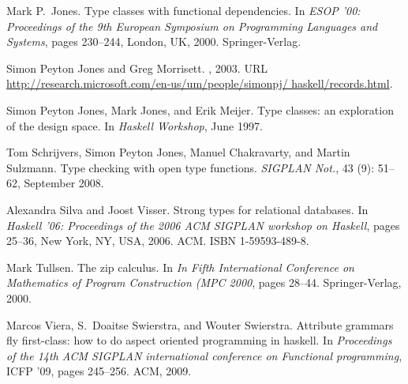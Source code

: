 \documentclass[natbib]{sigplanconf}
\begin{document}
\begin{flushleft}
\begin{thebibliography}{24}
Mark P.~Jones.
\newblock Type classes with functional dependencies.
\newblock In \emph{ESOP '00: Proceedings of the 9th European Symposium on
  Programming Languages and Systems}, pages 230--244, London, UK, 2000.
  Springer-Verlag.

Simon {Peyton Jones} and Greg Morrisett.
, 2003.
\newblock URL \url{http://research.microsoft.com/en-us/um/people/simonpj/
  haskell/records.html}.

Simon {Peyton Jones}, Mark Jones, and Erik Meijer.
\newblock Type classes: an exploration of the design space.
\newblock In \emph{Haskell Workshop}, June 1997.

\vfill
\eject


Tom Schrijvers, Simon {Peyton Jones}, Manuel Chakravarty, and Martin Sulzmann.
\newblock Type checking with open type functions.
\newblock \emph{SIGPLAN Not.}, 43 (9): 51--62, September
  2008.

Alexandra Silva and Joost Visser.
\newblock Strong types for relational databases.
\newblock In \emph{Haskell '06: Proceedings of the 2006 ACM SIGPLAN workshop on
  Haskell}, pages 25--36, New York, NY, USA, 2006. ACM.
\newblock ISBN 1-59593-489-8.

Mark Tullsen.
\newblock The zip calculus.
\newblock In \emph{In Fifth International Conference on Mathematics of Program
  Construction (MPC 2000}, pages 28--44. Springer-Verlag, 2000.

Marcos Viera, S.~Doaitse Swierstra, and Wouter Swierstra.
\newblock Attribute grammars fly first-class: how to do aspect oriented
  programming in haskell.
\newblock In \emph{Proceedings of the 14th ACM SIGPLAN international conference
  on Functional programming}, ICFP '09, pages 245--256. ACM, 2009.

\end{thebibliography}
\end{flushleft}

\end{document}
